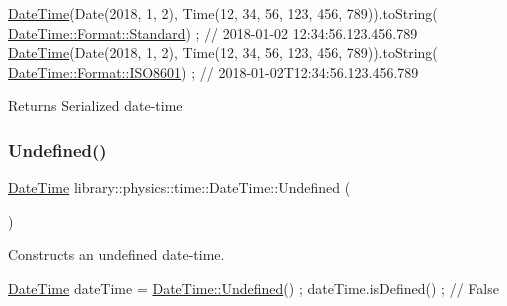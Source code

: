 \begin{DoxyCode}
\hyperlink{classlibrary_1_1physics_1_1time_1_1_date_time_a4ea629e533f335c928e037c4ead4646e}{DateTime}(Date(2018, 1, 2), Time(12, 34, 56, 123, 456, 789)).toString(
      \hyperlink{classlibrary_1_1physics_1_1time_1_1_date_time_a99e6afd988c9b091b1540d707922c804aeb6d8ae6f20283755b339c0dc273988b}{DateTime::Format::Standard}) ; \textcolor{comment}{// 2018-01-02 12:34:56.123.456.789}
\hyperlink{classlibrary_1_1physics_1_1time_1_1_date_time_a4ea629e533f335c928e037c4ead4646e}{DateTime}(Date(2018, 1, 2), Time(12, 34, 56, 123, 456, 789)).toString(
      \hyperlink{classlibrary_1_1physics_1_1time_1_1_date_time_a99e6afd988c9b091b1540d707922c804a35b6786739efcdc5a74ab1dca29d3b6b}{DateTime::Format::ISO8601}) ; \textcolor{comment}{// 2018-01-02T12:34:56.123.456.789}
\end{DoxyCode}


\begin{DoxyReturn}{Returns}
Serialized date-\/time 
\end{DoxyReturn}
\mbox{\label{classlibrary_1_1physics_1_1time_1_1_date_time_a0e3772033a2cdd3a0c4dca7aac7a53ae}} 
\subsubsection{\texorpdfstring{Undefined()}{Undefined()}}
{\footnotesize\ttfamily \hyperlink{classlibrary_1_1physics_1_1time_1_1_date_time}{Date\+Time} library\+::physics\+::time\+::\+Date\+Time\+::\+Undefined (\begin{DoxyParamCaption}{ }\end{DoxyParamCaption})\hspace{0.3cm}{\ttfamily [static]}}



Constructs an undefined date-\/time. 


\begin{DoxyCode}
\hyperlink{classlibrary_1_1physics_1_1time_1_1_date_time_a4ea629e533f335c928e037c4ead4646e}{DateTime} dateTime = \hyperlink{classlibrary_1_1physics_1_1time_1_1_date_time_a0e3772033a2cdd3a0c4dca7aac7a53ae}{DateTime::Undefined}() ;
dateTime.isDefined() ; \textcolor{comment}{// False}
\end{DoxyCode}


